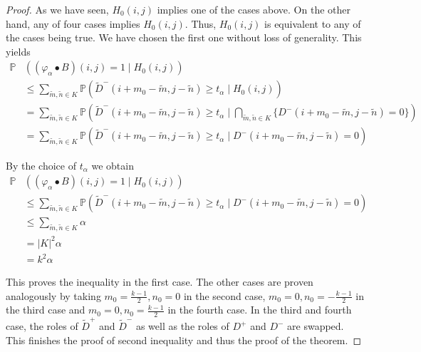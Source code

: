 \documentclass[a4paper,12pt]{article}
\newcommand{\abs}[1]{\lvert#1\rvert}
\theoremstyle{plain}
\theoremstyle{definition}
\theoremstyle{remark}
\begin{document}
\begin{proof}
	As we have seen, $H_0(i, j)$ implies one of the cases above. On the other hand, any of four cases implies $H_0(i, j)$. Thus, $H_0(i, j)$ is equivalent to any of the cases being true. We have chosen the first one without loss of generality. This yields
	\begin{align*}
		\mathbb{P}&( (\varphi_\alpha \bullet B)(i, j) = 1 \mid H_0(i, j) ) \\
		&\leq \sum_{\tilde{m}, \tilde{n} \in K} \mathbb{P}\left( \tilde{D}^-(i + m_0 - \tilde{m}, j - \tilde{n}) \geq t_\alpha \mid H_0(i, j) \right) \\
		&= \sum_{\tilde{m}, \tilde{n} \in K} \mathbb{P}\left( \tilde{D}^-(i + m_0 - \tilde{m}, j - \tilde{n}) \geq t_\alpha \mid \bigcap_{\tilde{m}, \tilde{n} \in K} \{ D^-(i + m_0 - \tilde{m}, j - \tilde{n}) = 0 \} \right) \\
		&= \sum_{\tilde{m}, \tilde{n} \in K} \mathbb{P}\left( \tilde{D}^-(i + m_0 - \tilde{m}, j - \tilde{n}) \geq t_\alpha \mid D^-(i + m_0 - \tilde{m}, j - \tilde{n}) = 0 \right)
	\end{align*}
	
	By the choice of $t_\alpha$ we obtain
	\begin{align*}
		\mathbb{P}&( (\varphi_\alpha \bullet B)(i, j) = 1 \mid H_0(i, j) ) \\
		&\leq \sum_{\tilde{m}, \tilde{n} \in K} \mathbb{P}\left( \tilde{D}^-(i + m_0 - \tilde{m}, j - \tilde{n}) \geq t_\alpha \mid D^-(i + m_0 - \tilde{m}, j - \tilde{n}) = 0 \right) \\
		&\leq \sum_{\tilde{m}, \tilde{n} \in K} \alpha \\
		&= \abs{K}^2 \alpha \\
		&= k^2 \alpha
	\end{align*}
	
	This proves the inequality in the first case. The other cases are proven analogously by taking $m_0 = \frac{k - 1}{2}, n_0 = 0$ in the second case, $m_0 = 0, n_0 = -\frac{k - 1}{2}$ in the third case and $m_0 = 0, n_0 = \frac{k - 1}{2}$ in the fourth case. In the third and fourth case, the roles of $\tilde{D}^+$ and $\tilde{D}^-$ as well as the roles of $D^+$ and $D^-$ are swapped. This finishes the proof of second inequality and thus the proof of the theorem.
\end{proof}

\newpage
\end{document}
